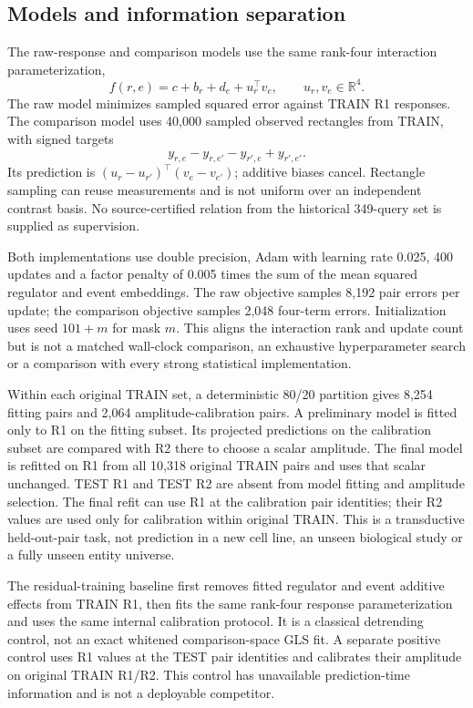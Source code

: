 \documentclass[11pt]{article}
\begin{document}
\subsection{Models and information separation}
The raw-response and comparison models use the same rank-four interaction parameterization,
\[
 f(r,e)=c+b_r+d_e+u_r^\top v_e,\qquad u_r,v_e\in\mathbb R^4.
\]
The raw model minimizes sampled squared error against TRAIN R1 responses. The comparison model uses 40,000 sampled observed rectangles from TRAIN, with signed targets
\[
 y_{r,e}-y_{r,e'}-y_{r',e}+y_{r',e'}.
\]
Its prediction is $(u_r-u_{r'})^\top(v_e-v_{e'})$; additive biases cancel. Rectangle sampling can reuse measurements and is not uniform over an independent contrast basis. No source-certified relation from the historical 349-query set is supplied as supervision.

Both implementations use double precision, Adam with learning rate 0.025, 400 updates and a factor penalty of 0.005 times the sum of the mean squared regulator and event embeddings. The raw objective samples 8,192 pair errors per update; the comparison objective samples 2,048 four-term errors. Initialization uses seed $101+m$ for mask $m$. This aligns the interaction rank and update count but is not a matched wall-clock comparison, an exhaustive hyperparameter search or a comparison with every strong statistical implementation.

Within each original TRAIN set, a deterministic 80/20 partition gives 8,254 fitting pairs and 2,064 amplitude-calibration pairs. A preliminary model is fitted only to R1 on the fitting subset. Its projected predictions on the calibration subset are compared with R2 there to choose a scalar amplitude. The final model is refitted on R1 from all 10,318 original TRAIN pairs and uses that scalar unchanged. TEST R1 and TEST R2 are absent from model fitting and amplitude selection. The final refit can use R1 at the calibration pair identities; their R2 values are used only for calibration within original TRAIN. This is a transductive held-out-pair task, not prediction in a new cell line, an unseen biological study or a fully unseen entity universe.

The residual-training baseline first removes fitted regulator and event additive effects from TRAIN R1, then fits the same rank-four response parameterization and uses the same internal calibration protocol. It is a classical detrending control, not an exact whitened comparison-space GLS fit. A separate positive control uses R1 values at the TEST pair identities and calibrates their amplitude on original TRAIN R1/R2. This control has unavailable prediction-time information and is not a deployable competitor.
\end{document}
